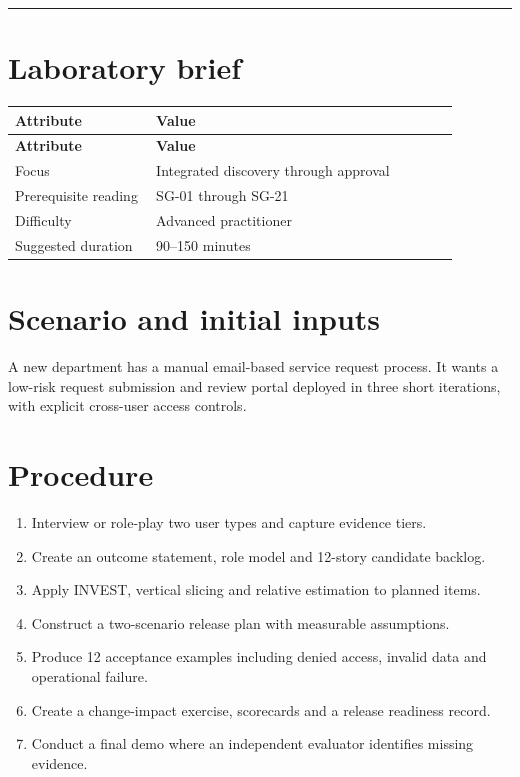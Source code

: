 \documentclass[11pt,letterpaper]{article}
\begin{document}
\tableofcontents\medskip\noindent\rule{\linewidth}{0.4pt}\medskip
\section{Laboratory brief}
\begin{longtable}{|p{0.28\linewidth}|p{0.60\linewidth}|}\hline
\textbf{Attribute} & \textbf{Value} \\ \hline\endfirsthead\hline
\textbf{Attribute} & \textbf{Value} \\ \hline\endhead
Focus & Integrated discovery through approval \\ \hline
Prerequisite reading & SG-01 through SG-21 \\ \hline
Difficulty & Advanced practitioner \\ \hline
Suggested duration & 90–150 minutes \\ \hline
\end{longtable}
\section{Scenario and initial inputs}
A new department has a manual email-based service request process. It wants a low-risk request submission and review portal deployed in three short iterations, with explicit cross-user access controls.

\section{Procedure}
\begin{enumerate}[leftmargin=*,itemsep=3pt]
\item Interview or role-play two user types and capture evidence tiers.
\item Create an outcome statement, role model and 12-story candidate backlog.
\item Apply INVEST, vertical slicing and relative estimation to planned items.
\item Construct a two-scenario release plan with measurable assumptions.
\item Produce 12 acceptance examples including denied access, invalid data and operational failure.
\item Create a change-impact exercise, scorecards and a release readiness record.
\item Conduct a final demo where an independent evaluator identifies missing evidence.
\end{enumerate}
\end{document}
